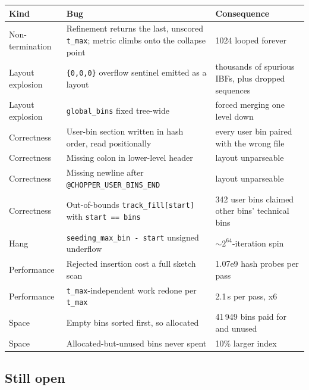 \documentclass[11pt,a4paper]{article}
\newcommand{\code}[1]{\lstinline[basicstyle=\ttfamily\small]!#1!}
\begin{document}
\begin{longtable}{@{}p{4.2cm}p{6.0cm}p{4.6cm}@{}}
\toprule
\textbf{Kind} & \textbf{Bug} & \textbf{Consequence} \\
\midrule
\endhead
Non-termination & Refinement returns the last, unscored \code{t_max}; metric climbs onto the
  collapse point & 1024 looped forever \\
Layout explosion & \code{{0,0,0}} overflow sentinel emitted as a layout & thousands of spurious
  IBFs, plus dropped sequences \\
Layout explosion & \code{global_bins} fixed tree-wide & forced merging one level down \\
Correctness & User-bin section written in hash order, read positionally & every user bin paired
  with the wrong file \\
Correctness & Missing colon in lower-level header & layout unparseable \\
Correctness & Missing newline after \code{@CHOPPER_USER_BINS_END} & layout unparseable \\
Correctness & Out-of-bounds \code{track_fill[start]} with \code{start == bins} & 342 user bins
  claimed other bins' technical bins \\
Hang & \code{seeding_max_bin - start} unsigned underflow & ${\sim}2^{64}$-iteration spin \\
Performance & Rejected insertion cost a full sketch scan & 1.07e9 hash probes per pass \\
Performance & \code{t_max}-independent work redone per \code{t_max} & 2.1\,s per pass, x6 \\
Space & Empty bins sorted first, so allocated & 41\,949 bins paid for and unused \\
Space & Allocated-but-unused bins never spent & 10\% larger index \\
\bottomrule
\end{longtable}

\subsection*{Still open}
\end{document}

